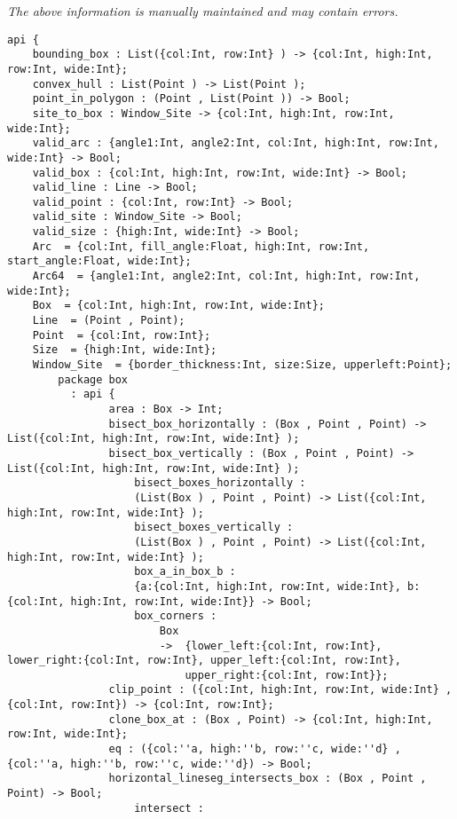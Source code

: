 \label{pkg:geometry2d}

{\tiny \it The above information is manually maintained and may contain errors.}
\begin{verbatim}
api {
    bounding_box : List({col:Int, row:Int} ) -> {col:Int, high:Int, row:Int, wide:Int};
    convex_hull : List(Point ) -> List(Point );
    point_in_polygon : (Point , List(Point )) -> Bool;
    site_to_box : Window_Site -> {col:Int, high:Int, row:Int, wide:Int};
    valid_arc : {angle1:Int, angle2:Int, col:Int, high:Int, row:Int, wide:Int} -> Bool;
    valid_box : {col:Int, high:Int, row:Int, wide:Int} -> Bool;
    valid_line : Line -> Bool;
    valid_point : {col:Int, row:Int} -> Bool;
    valid_site : Window_Site -> Bool;
    valid_size : {high:Int, wide:Int} -> Bool;
    Arc  = {col:Int, fill_angle:Float, high:Int, row:Int, start_angle:Float, wide:Int};
    Arc64  = {angle1:Int, angle2:Int, col:Int, high:Int, row:Int, wide:Int};
    Box  = {col:Int, high:Int, row:Int, wide:Int};
    Line  = (Point , Point);
    Point  = {col:Int, row:Int};
    Size  = {high:Int, wide:Int};
    Window_Site  = {border_thickness:Int, size:Size, upperleft:Point};
        package box
          : api {
                area : Box -> Int;
                bisect_box_horizontally : (Box , Point , Point) -> List({col:Int, high:Int, row:Int, wide:Int} );
                bisect_box_vertically : (Box , Point , Point) -> List({col:Int, high:Int, row:Int, wide:Int} );
                    bisect_boxes_horizontally :
                    (List(Box ) , Point , Point) -> List({col:Int, high:Int, row:Int, wide:Int} );
                    bisect_boxes_vertically :
                    (List(Box ) , Point , Point) -> List({col:Int, high:Int, row:Int, wide:Int} );
                    box_a_in_box_b :
                    {a:{col:Int, high:Int, row:Int, wide:Int}, b:{col:Int, high:Int, row:Int, wide:Int}} -> Bool;
                    box_corners :
                        Box
                        ->  {lower_left:{col:Int, row:Int}, lower_right:{col:Int, row:Int}, upper_left:{col:Int, row:Int},
                            upper_right:{col:Int, row:Int}};
                clip_point : ({col:Int, high:Int, row:Int, wide:Int} , {col:Int, row:Int}) -> {col:Int, row:Int};
                clone_box_at : (Box , Point) -> {col:Int, high:Int, row:Int, wide:Int};
                eq : ({col:''a, high:''b, row:''c, wide:''d} , {col:''a, high:''b, row:''c, wide:''d}) -> Bool;
                horizontal_lineseg_intersects_box : (Box , Point , Point) -> Bool;
                    intersect :

\end{verbatim}

